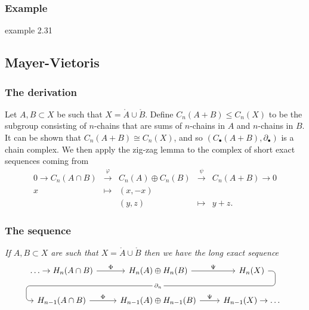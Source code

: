 \documentclass[10pt]{article}
\newcommand{\interior}[1]{\mathring{#1}}
\begin{document}
            \subsubsection{Example}

                example 2.31

        \subsection{Mayer-Vietoris}

            \subsubsection{The derivation}

                Let $A,B\subset X$ be such that $X=\interior{A}\cup\interior{B}$.
                Define $C_n(A+B)\leqslant C_n(X)$ to be the subgroup consisting of $n$-chains that are sums of $n$-chains in $A$ and $n$-chains in $B$.
                It can be shown that $C_n(A+B)\cong C_n(X)$, and so $(C_\bullet(A+B),\partial_\bullet)$ is a chain complex.
                We then apply the zig-zag lemma to the complex of short exact sequences coming from
                \begin{equation*}
                    \begin{array}{rcccl}
                        0\to C_n(A\cap B) & \xrightarrow{\varphi} & C_n(A)\oplus C_n(B) & \xrightarrow{\psi} & C_n(A+B)\to0\\[.5em]
                        x & \mapsto & (x,-x) & &\\[.2em]
                        & & (y,z) & \mapsto & y+z.
                    \end{array}
                \end{equation*}

            \subsubsection{The sequence}

                \emph{If $A,B\subset X$ are such that $X=\interior{A}\cup\interior{B}$ then we have the long exact sequence}
                \begin{equation*}
                    \begin{tikzcd}
                        \ldots\to{H}_n(A\cap B) \rar{\Phi}
                        & {H}_n(A)\oplus{H}_n(B) \rar{\Psi} \ar[draw=none]{d}[name=X, anchor=center]{}
                        & {H}_n(X) \ar[rounded corners,
                                to path={ -- ([xshift=2ex]\tikztostart.east)
                                          |- (X.center) \tikztonodes
                                          -| ([xshift=-2ex]\tikztotarget.west)
                                          -- (\tikztotarget)}]{dll}[description, at end]{\partial_n} \\
                        {H}_{n-1}(A\cap B) \rar{\Phi}
                        & {H}_{n-1}(A)\oplus{H}_{n-1}(B) \rar{\Psi}
                        & {H}_{n-1}(X)\to\ldots
                    \end{tikzcd}
                \end{equation*}
\end{document}
